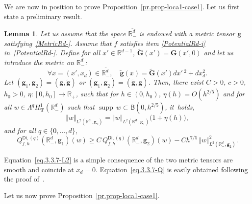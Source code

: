 \documentclass[10pt]{amsart}
\newcommand{\mbf}[1]{\mathbf{#1}}
\DeclareMathOperator\supp{supp}
\theoremstyle{plain}
\newtheorem{lemma}[proposition]{Lemma}
\theoremstyle{definition}
\begin{document}
We are now in
position to prove Proposition~\ref{pr.prop-loca1-case1}.
Let us first state a preliminary result.
\begin{lemma}\label{le-3.3.7}
Let us assume that the space $\overline{\mathbb R^d_-}$ is endowed with a metric tensor $ \mbf{g}$ satisfying~\ref{MetricRd-}. Assume that $f$ satisfies item \eqref{PotentialRd-i} in~\ref{PotentialRd-}.
Define for all $x'\in \mathbb R^{d-1}$, $ \tilde{\mbf G}(x')= {\mbf
G}(x',0)$ and let us introduce the metric on $\mathbb R^d_-$:
\begin{equation}\label{eq.m-tilde}
\forall x=(x',x_d)\in \overline{\mathbb R^d_-}, \quad \tilde{\mbf g}(x)= \tilde{\mbf G}(x')dx'\,^2+dx_d^2.
\end{equation}
Let $ (\mbf g_1,\mbf g_2)=(\mbf g, \tilde{\mbf g})$ or $ (\mbf g_1,\mbf g_2)=(\tilde{\mbf g}, \mbf g)$.
Then, there exist $C>0$, $c>0$, $h_0>0$, $\eta:[0,h_0]\to\mathbb
R_+$, such that for $h\in (0,h_0)$, $\eta(h)=O(h^{2/5 })$ and for all $w\in \Lambda^q H^1_{\mbf T}(\mathbb R^d_-)$ such that $\supp\, w\subset \mathsf B(0,h^{2/5})$, it~holds,
\begin{equation}\label{eq.3.3.7-L2}
\Vert w \Vert_{L^2(\mathbb R^d_-, \mbf g_2)} = \Vert w \Vert_{L^2(\mathbb R^d_-, \mbf g_1)} \bigl(1+\eta(h)\bigr),
\end{equation}
and for all $q \in \{0, \ldots, d\}$,
\begin{equation}\label{eq.3.3.7-Q}
Q_{f,h}^{\mathsf{Di},(q)}(\mathbb R^d_-, \mbf g_1)(w)\ge C\, Q_{f,h}^{\mathsf{Di},(q)}(\mathbb R^d_-, \mbf g_2)(w)- Ch^{ 7/5}\, \Vert w \Vert_{L^2(\mathbb R^d_-, \mbf g_2)}^2.
\end{equation}
\end{lemma}
Equation~\eqref{eq.3.3.7-L2} is a simple consequence of the two metric
tensors are smooth and coincide at
$x_d=0$. Equation~\eqref{eq.3.3.7-Q} is easily obtained following the
proof of~\cite[Lem.\,3.3.7]{helffer-nier-06}.

Let us now prove Proposition~\ref{pr.prop-loca1-case1}.
\end{document}

